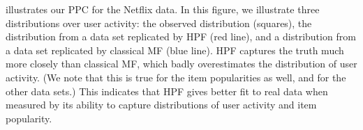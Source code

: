  illustrates our PPC for the Netflix data.  In this figure, we
illustrate three distributions over user activity: the observed
distribution (squares), the distribution from a data set replicated by
HPF (red line), and a distribution from a data set replicated by
classical MF (blue line).  HPF captures the truth much more closely
than classical MF, which badly overestimates the distribution of user
activity.  (We note that this is true for the item popularities as
well, and for the other data sets.) This indicates that HPF gives
better fit to real data when measured by its ability to capture
distributions of user activity and item popularity.



